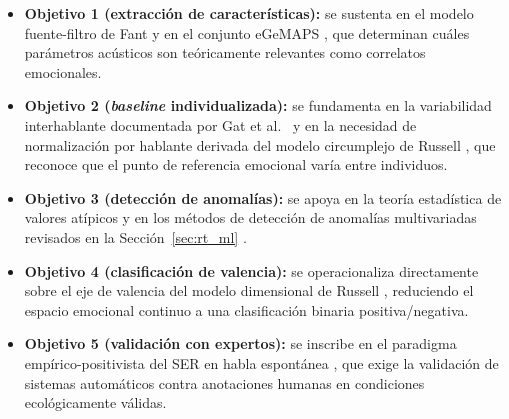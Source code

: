 \begin{itemize}
    \item \textbf{Objetivo 1 (extracción de características):} se sustenta en el modelo
          fuente-filtro de Fant \cite{fant1960acoustic} y en el conjunto eGeMAPS
          \cite{eyben2016gemaps}, que determinan cuáles parámetros acústicos son
          teóricamente relevantes como correlatos emocionales.
    \item \textbf{Objetivo 2 (\textit{baseline} individualizada):} se fundamenta en la
          variabilidad interhablante documentada por Gat et al.\ \cite{gat2022} y en la
          necesidad de normalización por hablante derivada del modelo circumplejo de
          Russell \cite{russell1980circumplex}, que reconoce que el punto de referencia
          emocional varía entre individuos.
    \item \textbf{Objetivo 3 (detección de anomalías):} se apoya en la teoría
          estadística de valores atípicos y en los métodos de detección de anomalías
          multivariadas revisados en la Sección~\ref{sec:rt_ml} \cite{xu2023, nath2024}.
    \item \textbf{Objetivo 4 (clasificación de valencia):} se operacionaliza
          directamente sobre el eje de valencia del modelo dimensional de Russell
          \cite{russell1980circumplex}, reduciendo el espacio emocional continuo a una
          clasificación binaria positiva/negativa.
    \item \textbf{Objetivo 5 (validación con expertos):} se inscribe en el paradigma
          empírico-positivista del SER en habla espontánea \cite{delope2023, feng2023},
          que exige la validación de sistemas automáticos contra anotaciones humanas
          en condiciones ecológicamente válidas.
\end{itemize}
